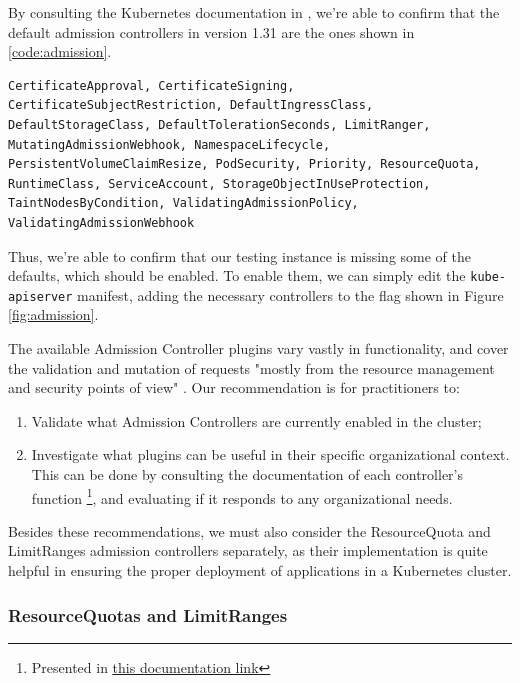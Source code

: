 \documentclass[a4paper,11pt,openright,BCOR=15mm]{scrbook}
\begin{document}
By consulting the Kubernetes documentation in \cite{the_linux_foundation_admission_2024}, we're able to confirm that the default admission controllers in version 1.31 are the ones shown in \ref{code:admission}.

\begin{lstlisting}[style=yaml,caption={Default Admission Controllers},label=code:admission]
	CertificateApproval, CertificateSigning, CertificateSubjectRestriction, DefaultIngressClass, DefaultStorageClass, DefaultTolerationSeconds, LimitRanger, MutatingAdmissionWebhook, NamespaceLifecycle, PersistentVolumeClaimResize, PodSecurity, Priority, ResourceQuota, RuntimeClass, ServiceAccount, StorageObjectInUseProtection, TaintNodesByCondition, ValidatingAdmissionPolicy, ValidatingAdmissionWebhook
\end{lstlisting}

Thus, we're able to confirm that our testing instance is missing some of the defaults, which should be enabled. To enable them, we can simply edit the \texttt{kube-apiserver} manifest, adding the necessary controllers to the flag shown in Figure \ref{fig:admission}.

The available Admission Controller plugins vary vastly in functionality, and cover the validation and mutation of requests "mostly from the resource management and security points of view" \cite{sayfan_mastering_2020}. Our recommendation is for practitioners to:

\begin{enumerate}
	\item Validate what Admission Controllers are currently enabled in the cluster;
	\item Investigate what plugins can be useful in their specific organizational context. This can be done by consulting the documentation of each controller's function \footnote{Presented in \href{https://kubernetes.io/docs/reference/access-authn-authz/admission-controllers/\#what-does-each-admission-controller-do}{\underline{this documentation link}}}, and evaluating if it responds to any organizational needs.
\end{enumerate}

Besides these recommendations, we must also consider the ResourceQuota and LimitRanges admission controllers separately, as their implementation is quite helpful in ensuring the proper deployment of applications in a Kubernetes cluster.

\subsubsection{ResourceQuotas and LimitRanges}
\end{document}
